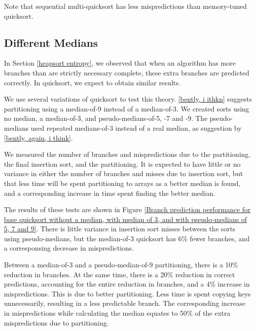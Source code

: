 Note that sequential multi-quicksort has less mispredictions than memory-tuned quicksort.


\subsection{Different Medians}

\label{quick-predictors2}

\label{quicksort entropy}

In Section \ref{heapsort entropy}, we observed that when an algorithm has more
branches than are strictly necessary complete, these extra branches are
predicted correctly. In quicksort, we expect to obtain similar results.


We use several variations of quicksort to test this theory. \ref{bently, i
ithkn} suggests partitioning using a median-of-9 instead of a median-of-3. We
created sorts using no median, a median-of-3, and pseudo-medians-of-5, -7 and
-9. The pseudo-medians used repeated medians-of-3 instead of a real
median, as suggestion by \ref{bently, again, i think}. 

We measured the number of branches and mispredictions due to the partitioning,
the final insertion sort, and the partitioning. It is expected to have little or
no variance in either the number of branches and misses due to insertion sort,
but that less time will be spent partitioning to arrays as a better median is
found, and a corresponding increase in time spent finding the better median.

The results of these tests are shown in Figure \ref{Branch prediction
performance for base quicksort without a median, with median of 3, and with
pseudo-medians of 5, 7 and 9}. There is little variance in insertion sort misses
between the sorts using pseudo-medians, but the median-of-3 quicksort has
6\% fewer branches, and a corresponsing decrease in mispredictions.

Between a median-of-3 and a pseudo-median-of-9 partitioning, there is a
10\% reduction in branches. At the same time, there is a 20\% reduction in
correct predictions, accounting for the entire reduction in branches, and a 4\%
increase in mispredictions. This is due to better partitioning. Less time is
spent copying keys unnecessarily, resulting in a less predictable branch. The
corresponding increase in mispredictions while calculating the median equates to
50\% of the extra mispredictions due to partitioning.

